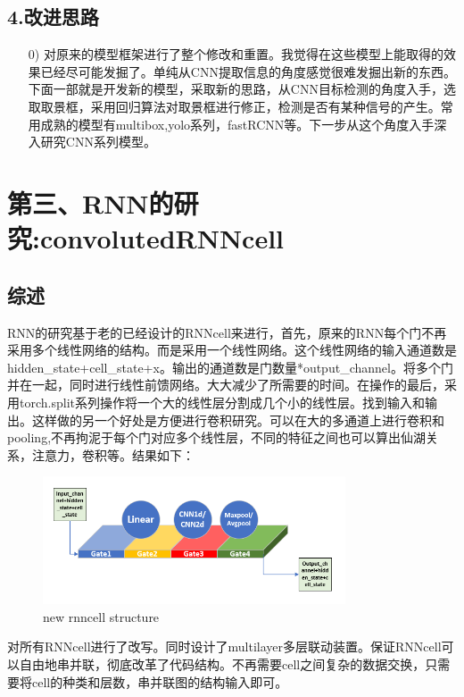 \documentclass[11pt]{ctexart}
\begin{document}
\subsection{4.改进思路}
\begin{itemize}
  \item [0)]
  对原来的模型框架进行了整个修改和重置。我觉得在这些模型上能取得的效果已经尽可能发掘了。单纯从CNN提取信息的角度感觉很难发掘出新的东西。下面一部就是开发新的模型，采取新的思路，从CNN目标检测的角度入手，选取取景框，采用回归算法对取景框进行修正，检测是否有某种信号的产生。常用成熟的模型有multibox,yolo系列，fastRCNN等。下一步从这个角度入手深入研究CNN系列模型。
\end{itemize}


\section{第三、RNN的研究:convolutedRNNcell}
\subsection{综述}
RNN的研究基于老的已经设计的RNNcell来进行，首先，原来的RNN每个门不再采用多个线性网络的结构。而是采用一个线性网络。这个线性网络的输入通道数是hidden\_state+cell\_state+x。输出的通道数是门数量*output\_channel。将多个门并在一起，同时进行线性前馈网络。大大减少了所需要的时间。在操作的最后，采用torch.split系列操作将一个大的线性层分割成几个小的线性层。找到输入和输出。这样做的另一个好处是方便进行卷积研究。可以在大的多通道上进行卷积和pooling,不再拘泥于每个门对应多个线性层，不同的特征之间也可以算出仙湖关系，注意力，卷积等。结果如下：
\begin{figure}[H]
\begin{center}
\includegraphics[width=0.8\textwidth]{str1.PNG}
\end{center}
\caption{new rnncell structure}
\label{FIG.3}
\end{figure}
对所有RNNcell进行了改写。同时设计了multilayer多层联动装置。保证RNNcell可以自由地串并联，彻底改革了代码结构。不再需要cell之间复杂的数据交换，只需要将cell的种类和层数，串并联图的结构输入即可。
\end{document}
